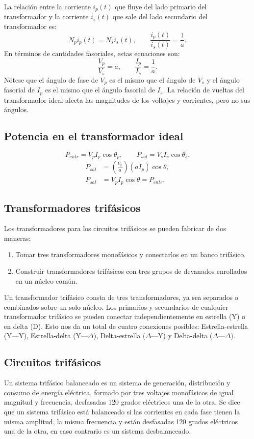 \documentclass[12pt,a4paper]{article}
\begin{document}
La relación entre la corriente $i_p(t)$ que fluye del lado primario del transformador y la corriente $i_s(t)$ que sale del lado secundario del transformador es:
\begin{equation*}
N_p i_p(t)=N_s i_s(t),\qquad \frac{i_p(t)}{i_s(t)}=\frac{1}{a}.
\end{equation*}
En términos de cantidades fasoriales, estas ecuaciones son:
\begin{equation*}
\frac{V_p}{V_s}=a,\qquad \frac{I_p}{I_s}=\frac{1}{a}.
\end{equation*}
Nótese que el ángulo de fase de $V_p$ es el mismo que el ángulo de $V_s$ y el ángulo fasorial de $I_p$ es el mismo que el ángulo fasorial de $I_s$. La relación de vueltas del transformador ideal afecta las magnitudes de los voltajes y corrientes, pero no sus ángulos.
\subsection{Potencia en el transformador ideal}
\begin{equation*}
P_{entr}=V_p I_p\cos\theta_p,\qquad P_{sal}=V_s I_s\cos\theta_s.
\end{equation*}
\begin{align*}
P_{sal}&=\left(\frac{V_p}{a}\right)(aI_p)\cos\theta,\\
P_{sal}&=V_p I_p\cos\theta=P_{entr}.
\end{align*}
\subsection{Transformadores trifásicos}
Los transformadores para los circuitos trifásicos se pueden fabricar de dos maneras:
\begin{enumerate}
\item Tomar tres transformadores monofásicos y conectarlos en un banco trifásico.
\item Construir transformadores trifásicos con tres grupos de devanados enrollados en un núcleo común.
\end{enumerate}
Un transformador trifásico consta de tres transformadores, ya sea separados o combinados sobre un solo núcleo. Los primarios y secundarios de cualquier transformador trifásico se pueden conectar independientemente en estrella (Y) o en delta (D). Esto nos da un total de cuatro conexiones posibles: Estrella-estrella (Y---Y), Estrella-delta (Y---$\Delta$), Delta-estrella ($\Delta$---Y) y Delta-delta ($\Delta$---$\Delta$).
\subsection{Circuitos trifásicos}
Un sistema trifásico balanceado es un sistema de generación, distribución y consumo de energía eléctrica, formado por tres voltajes monofásicos de igual magnitud y frecuencia, desfasadas 120 grados eléctricos una de la otra. Se dice que un sistema trifásico está balanceado si las corrientes en cada fase tienen la misma amplitud, la misma frecuencia y están desfasadas 120 grados eléctricos una de la otra, en caso contrario es un sistema desbalanceado.
\end{document}
